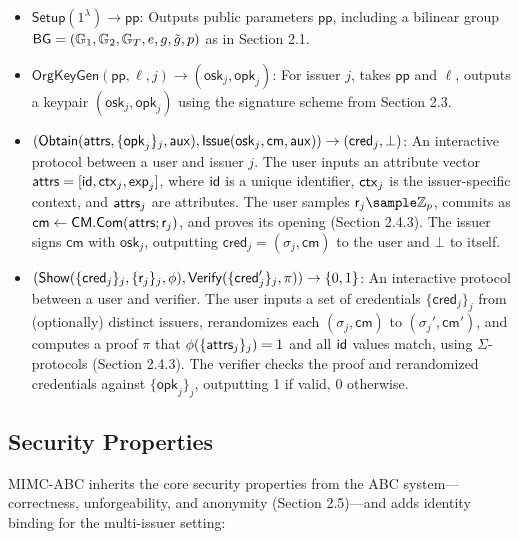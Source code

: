 \begin{itemize}
    \item $\mathsf{Setup}(1^\lambda) \to \mathsf{pp}$: Outputs public parameters $\mathsf{pp}$, including a bilinear group $\mathsf{BG} = (\mathbb{G}_1, \mathbb{G}_2, \mathbb{G}_T, e, g, \tilde{g}, p)$ as in Section 2.1.
    
    \item $\mathsf{OrgKeyGen}(\mathsf{pp}, \ell, j) \to (\mathsf{osk}_j, \mathsf{opk}_j)$: For issuer $j$, takes $\mathsf{pp}$ and $\ell$, outputs a keypair $(\mathsf{osk}_j, \mathsf{opk}_j)$ using the signature scheme from Section 2.3.

    \item $(\mathsf{Obtain}(\mathsf{attrs}, \{\mathsf{opk}_j\}_j, \mathsf{aux}), \mathsf{Issue}(\mathsf{osk}_j, \mathsf{cm}, \mathsf{aux})) \to (\mathsf{cred}_j, \bot)$: An interactive protocol between a user and issuer $j$. The user inputs an attribute vector $\mathsf{attrs} = [\mathsf{id}, \mathsf{ctx}_j, \mathsf{exp}_j]$, where $\mathsf{id}$ is a unique identifier, $\mathsf{ctx}_j$ is the issuer-specific context, and $\mathsf{attrs}_j$ are attributes. The user samples $\usk_j \sample \Z_p$, commits as $\mathsf{cm} \gets \mathsf{CM.Com}(\mathsf{attrs}; \mathsf{r}_j)$, and proves its opening (Section 2.4.3). The issuer signs $\mathsf{cm}$ with $\mathsf{osk}_j$, outputting $\mathsf{cred}_j = (\sigma_j, \mathsf{cm})$ to the user and $\bot$ to itself.

    \item $(\mathsf{Show}(\{\mathsf{cred}_j\}_j, \{\mathsf{r}_j\}_j, \phi), \mathsf{Verify}(\{\mathsf{cred}_j'\}_j, \pi)) \to \{0,1\}$: An interactive protocol between a user and verifier. The user inputs a set of credentials $\{\mathsf{cred}_j\}_j$ from (optionally) distinct issuers, rerandomizes each $(\sigma_j, \mathsf{cm})$ to $(\sigma_j', \mathsf{cm}')$, and computes a proof $\pi$ that $\phi(\{\mathsf{attrs}_j\}_j) = 1$ and all $\mathsf{id}$ values match, using $\Sigma$-protocols (Section 2.4.3). The verifier checks the proof and rerandomized credentials against $\{\mathsf{opk}_j\}_j$, outputting 1 if valid, 0 otherwise.
\end{itemize}

\subsection{Security Properties}

MIMC-ABC inherits the core security properties from the ABC system—correctness, unforgeability, and anonymity (Section 2.5)—and adds identity binding for the multi-issuer setting:

